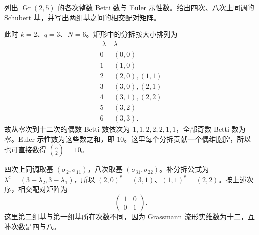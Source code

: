 \begin{exercise}\label{g2:ex:gr25-cells-pairing}
	列出 \(\operatorname{Gr}(2,5)\) 的各次整数 Betti 数与 Euler 示性数。给出四次、八次上同调的 Schubert 基，并写出两组基之间的相交配对矩阵。
\end{exercise}
\begin{solution}
	此时 \(k=2\)、\(q=3\)、\(N=6\)。矩形中的分拆按大小排列为
	\[
	\begin{array}{c|l}
		|\lambda|&\lambda\\\hline
		0&(0,0)\\
		1&(1,0)\\
		2&(2,0),(1,1)\\
		3&(3,0),(2,1)\\
		4&(3,1),(2,2)\\
		5&(3,2)\\
		6&(3,3).
	\end{array}
	\]
	故从零次到十二次的偶数 Betti 数依次为 \(1,1,2,2,2,1,1\)，全部奇数 Betti 数为零。Euler 示性数为这些数之和，即 \(10\)。这里每个分拆贡献一个偶维胞腔，所以也可直接数得 \(\binom52=10\)。

	四次上同调取基 \((\sigma_2,\sigma_{11})\)，八次取基 \((\sigma_{31},\sigma_{22})\)。补分拆公式为 \(\lambda^c=(3-\lambda_2,3-\lambda_1)\)，所以 \((2,0)^c=(3,1)\)、\((1,1)^c=(2,2)\)。按上述次序，相交配对矩阵为
	\[
		\begin{pmatrix}1&0\\0&1\end{pmatrix}.
	\]
	这里第二组基与第一组基所在次数不同，因为 Grassmann 流形实维数为十二，互补次数是四与八。
\end{solution}

